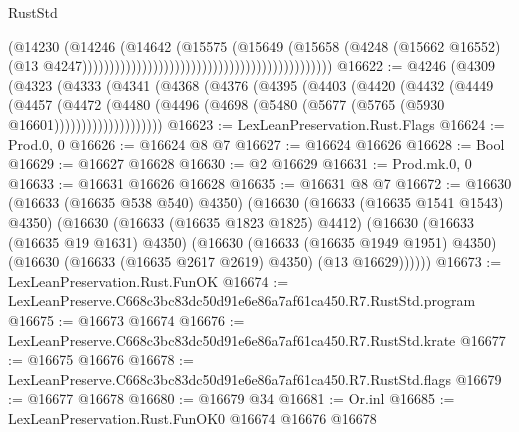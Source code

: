 \begin{lexlean}{RustStd}
\begin{coremodule}
                                                                                (@14230
                                                                                  (@14246
                                                                                    (@14642
                                                                                      (@15575
                                                                                        (@15649
                                                                                          (@15658
                                                                                            (@4248
                                                                                              (@15662
                                                                                                @16552)
                                                                                              (@13
                                                                                                @4247))))))))))))))))))))))))))))))))))))))))))))))
@16622 := @4246
    (@4309
      (@4323
        (@4333
          (@4341
            (@4368
              (@4376
                (@4395
                  (@4403
                    (@4420
                      (@4432
                        (@4449
                          (@4457
                            (@4472
                              (@4480
                                (@4496 (@4698 (@5480 (@5677 (@5765 (@5930 @16601))))))))))))))))))))
@16623 := LexLeanPreservation.Rust.Flags
@16624 := Prod.{0, 0}
@16626 := @16624 @8 @7
@16627 := @16624 @16626
@16628 := Bool
@16629 := @16627 @16628
@16630 := @2 @16629
@16631 := Prod.mk.{0, 0}
@16633 := @16631 @16626 @16628
@16635 := @16631 @8 @7
@16672 := @16630
    (@16633 (@16635 @538 @540) @4350)
    (@16630
      (@16633 (@16635 @1541 @1543) @4350)
      (@16630
        (@16633 (@16635 @1823 @1825) @4412)
        (@16630
          (@16633 (@16635 @19 @1631) @4350)
          (@16630
            (@16633 (@16635 @1949 @1951) @4350)
            (@16630 (@16633 (@16635 @2617 @2619) @4350) (@13 @16629))))))
@16673 := LexLeanPreservation.Rust.FunOK
@16674 := LexLeanPreserve.C668c3bc83dc50d91e6e86a7af61ca450.R7.RustStd.program
@16675 := @16673 @16674
@16676 := LexLeanPreserve.C668c3bc83dc50d91e6e86a7af61ca450.R7.RustStd.krate
@16677 := @16675 @16676
@16678 := LexLeanPreserve.C668c3bc83dc50d91e6e86a7af61ca450.R7.RustStd.flags
@16679 := @16677 @16678
@16680 := @16679 @34
@16681 := Or.inl
@16685 := LexLeanPreservation.Rust.FunOK0 @16674 @16676 @16678

\end{coremodule}
\end{lexlean}
